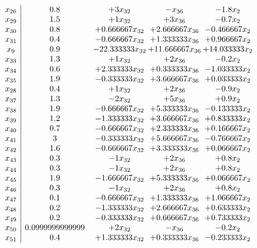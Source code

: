 \documentclass[11pt]{article}
\begin{document}
\[\begin{array}{c| c c@{\hskip 2pt} c@{\hskip 2pt} c@{\hskip 2pt} }
 x_{26}   &  0.8 & + 3 x_{32} & - x_{36} & -1.8 x_{2}\\
 x_{29}   &  1.5 & + 1 x_{32} & + 3 x_{36} & -0.7 x_{2}\\
 x_{30}   &  0.8 & + 0.666667 x_{32} & + 2.666667 x_{36} & -0.466667 x_{2}\\
 x_{31}   &  0.4 & -0.666667 x_{32} & + 1.333333 x_{36} & + 0.966667 x_{2}\\
 x_{9}   &  0.9 & -22.333333 x_{32} & + 11.666667 x_{36} & + 14.033333 x_{2}\\
 x_{33}   &  1.3 & + 1 x_{32} & + 2 x_{36} & -0.2 x_{2}\\
 x_{34}   &  0.6 & + 2.333333 x_{32} & + 0.333333 x_{36} & -1.033333 x_{2}\\
 x_{35}   &  1.9 & -0.333333 x_{32} & + 3.666667 x_{36} & + 0.033333 x_{2}\\
 x_{28}   &  0.4 & + 1 x_{32} & + 2 x_{36} & -0.9 x_{2}\\
 x_{37}   &  1.3 & -2 x_{32} & + 5 x_{36} & + 0.9 x_{2}\\
 x_{38}   &  1.9 & -0.666667 x_{32} & + 5.333333 x_{36} & -0.133333 x_{2}\\
 x_{39}   &  1.2 & -1.333333 x_{32} & + 3.666667 x_{36} & + 0.833333 x_{2}\\
 x_{40}   &  0.7 & -0.666667 x_{32} & + 2.333333 x_{36} & + 0.166667 x_{2}\\
 x_{41}   &  3 & -0.333333 x_{32} & + 5.666667 x_{36} & -0.766667 x_{2}\\
 x_{42}   &  1.6 & -0.666667 x_{32} & + 3.333333 x_{36} & + 0.066667 x_{2}\\
 x_{43}   &  0.3 & -1 x_{32} & + 2 x_{36} & + 0.8 x_{2}\\
 x_{44}   &  0.3 & -1 x_{32} & + 2 x_{36} & + 0.8 x_{2}\\
 x_{45}   &  1.9 & -1.666667 x_{32} & + 5.333333 x_{36} & + 0.066667 x_{2}\\
 x_{46}   &  0.3 & -1 x_{32} & + 2 x_{36} & + 0.8 x_{2}\\
 x_{47}   &  0.1 & -0.666667 x_{32} & + 1.333333 x_{36} & + 1.066667 x_{2}\\
 x_{48}   &  0.2 & -1.333333 x_{32} & + 2.666667 x_{36} & + 0.633333 x_{2}\\
 x_{49}   &  0.2 & -0.333333 x_{32} & + 0.666667 x_{36} & + 0.733333 x_{2}\\
 x_{50}   &  0.0999999999999 & + 2 x_{32} & - x_{36} & -0.2 x_{2}\\
 x_{51}   &  0.4 & + 1.333333 x_{32} & + 0.333333 x_{36} & -0.233333 x_{2}\\

\end{array}\]
\end{document}
